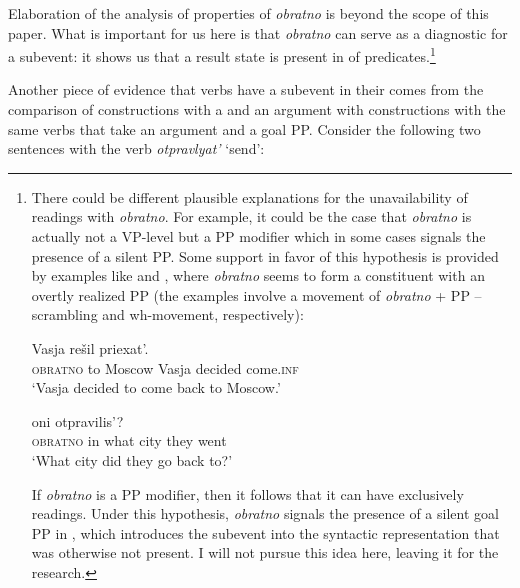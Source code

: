 \documentclass[output=paper]{langscibook}
\begin{document}
\noindent Elaboration of the analysis of properties of  \textit{obratno} is beyond the scope of this paper. What is important for us here is that \textit{obratno} can serve as a diagnostic for a  subevent: it shows us that a result state is present in  of  predicates.\footnote{There
  could be different plausible explanations for the unavailability of  readings with \textit{obratno}. For example, it could be the case that \textit{obratno} is actually not a VP-level  but a PP modifier which in some cases signals the presence of a silent PP. Some support in favor of this hypothesis is provided by examples like  and , where \textit{obratno} seems to form a constituent with an overtly realized PP (the examples involve a movement of \textit{obratno} + PP -- scrambling and wh-movement, respectively):

  \ea\label{ex:bondarenko:fn9i}
   Vasja rešil priexat’.\\
  {} \textsc{obratno} to Moscow Vasja decided come.\textsc{inf}\\
  \glt `Vasja decided to come back to Moscow.'
  \z

  \ea\label{ex:bondarenko:fn9ii}
     oni otpravilis’?\\
    {} \textsc{obratno} in what city they went\\
    \glt `What city did they go back to?'
    \z
    
    \noindent If \textit{obratno} is a PP modifier, then it follows that it can have exclusively  readings. Under this hypothesis, \textit{obratno} signals the presence of a silent goal PP in , which introduces the  subevent into the syntactic representation that was otherwise not present. I will not pursue this idea here, leaving it for the  research.
    }

Another piece of evidence that   verbs have a  sub\-event in their  comes from the comparison of  constructions with a  and an  argument with constructions with the same verbs that take an  argument and a goal PP. Consider the following two sentences with the verb \textit{otpravlyat’} ‘send’:
\end{document}
